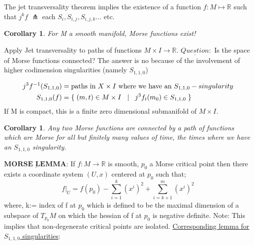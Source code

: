 \documentclass{article}
\newtheorem{corollary}[theorem]{Corollary}
\newtheorem{proposed work}[theorem]{Proposed Work}
\begin{document}
The jet transversality theorem implies the existence of a function $f:M\mapsto \mathbb{R}$ such that $j^{k}f$ $\pitchfork$ each $S_i,S_{i,j},S_{i,j,k}...$ etc.
\begin{corollary}
For M a smooth manifold, Morse functions exist! 
\end{corollary} 
Apply Jet transversality to paths of functions $M\times I\to \mathbb{R}.$
\newline
$\underline{Question}:$
Is the space of Morse functions connected?
The answer is no because of the involvement of higher codimension singularities (namely $S_{1,1,0}$)
\newline
\newline
\center
{}
\newline
\newline
\begin{align*}
j^3f^{-1}(S_{1,1,0})&=\text{paths in $X\times I$ where we have an $S_{1,1,0}-singularity$}\\ 
S_{1,1,0}(f)&=\{\hspace{1mm}(m,t)\in M\times I \hspace{3mm}|\hspace{3mm} j^3f_t(m_0)\in S_{1,1,0}\hspace{1mm}\}
\end{align*}
\newline
\newline
If M is compact, this is a finite zero dimensional submanifold of $M\times I$.

\begin{corollary}
Any two Morse functions are connected by a path of functions which are Morse for all but finitely many values of time, the times where we have an $S_{1,1,0}$ singularity.
\end{corollary}
\center $\underline{\textbf{MORSE LEMMA:}}$
If $f\colon M \to \mathbb{R}$ is smooth, $p_0$ a Morse critical point then there exists a coordinate system $(U,x)$ centered at $p_0$ such that;
$$f|_{U}=f(p_0)-\sum_{i=1}^{k}(x^i)^2+\sum_{i=k+1}^{m}(x^i)^2$$
where, k:= index of f at $p_0$ which is defined to be the maximal dimension of a subspace of $T_{p_0}M$ on which the hessian of f at $p_0$ is negative definite. 
\newline
Note: This implies that non-degenerate critical points are isolated. 
\newline
\newline
\underline{Corresponding lemma for $S_{1,1,0}$ singularities}:
\end{document}
